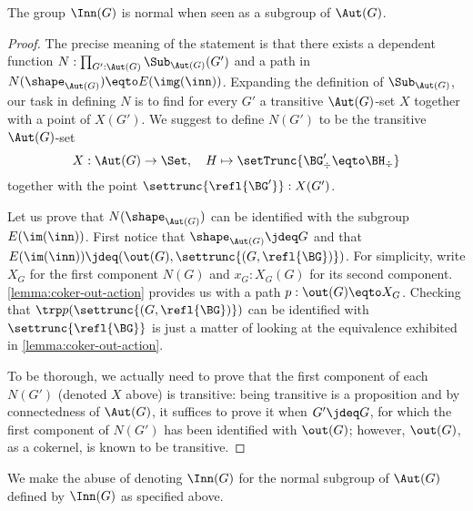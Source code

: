 \begin{lemma}
  The group $\Inn(G)$ is normal when seen as a subgroup of $\Aut(G)$.
\end{lemma}
\begin{proof}
  The precise meaning of the statement is that there exists a dependent function
  $N: \prod_{G':\Aut(G)} \Sub_{\Aut(G)}(G')$ and a path in
  $N(\shape_{\Aut(G)}) \eqto E(\img(\inn))$. Expanding the
  definition of $\Sub_{\Aut(G)}$, our task in defining $N$ is to find for every
  $G'$ a transitive $\Aut(G)$-set $X$ together with a point of $X(G')$. We
  suggest to define $N(G')$ to be the transitive $\Aut(G)$-set
  \begin{displaymath}
    X: \Aut(G) \to \Set,\quad H \mapsto \setTrunc{\BG'_\div \eqto \BH_\div}
  \end{displaymath}
  together with the point $\settrunc{\refl{\BG'}} : X(G')$.

  Let us prove that $N(\shape_{\Aut(G)})$ can be identified with the subgroup
  $E(\im(\inn))$. First notice that $\shape_{\Aut(G)} \jdeq G$ and that
  $E(\im(\inn)) \jdeq (\out(G),\settrunc{(G,\refl{\BG})})$. For simplicity,
  write $X_G$ for the first component $N(G)$ and $x_G: X_G(G)$ for its second
  component. \cref{lemma:coker-out-action} provides us with a path
  $p:\out(G) \eqto X_G$. Checking that $\trp p (\settrunc{(G,\refl{\BG})})$ can
  be identified with $\settrunc{\refl{\BG}}$ is just a matter of looking at the
  equivalence exhibited in \cref{lemma:coker-out-action}.


  To be thorough, we actually need to prove that the first component of each
  $N(G')$ (denoted $X$ above) is transitive: being transitive is a proposition
  and by connectedness of $\Aut(G)$, it suffices to prove it when $G'\jdeq G$,
  for which the first component of $N(G')$ has been identified with $\out(G)$;
  however, $\out(G)$, as a cokernel, is known to be transitive.
\end{proof}
We make the abuse of denoting $\Inn(G)$ for the normal subgroup of $\Aut(G)$
defined by $\Inn(G)$ as specified above.

